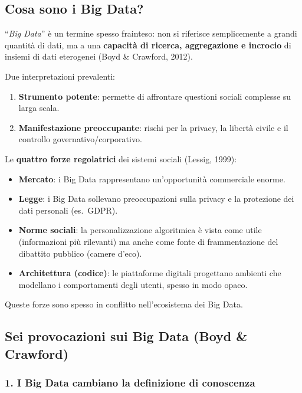 \documentclass[12pt,a4paper]{article}
\begin{document}
\subsection{Cosa sono i Big Data?}

``\textit{Big Data}'' è un termine spesso frainteso: non si riferisce semplicemente a
grandi quantità di dati, ma a una \textbf{capacità di ricerca, aggregazione e
incrocio} di insiemi di dati eterogenei (Boyd \& Crawford, 2012).

\medskip
\noindent Due interpretazioni prevalenti:
\begin{enumerate}
  \item \textbf{Strumento potente}: permette di affrontare questioni sociali complesse
        su larga scala.
  \item \textbf{Manifestazione preoccupante}: rischi per la privacy, la libertà civile
        e il controllo governativo/corporativo.
\end{enumerate}

\noindent Le \textbf{quattro forze regolatrici} dei sistemi sociali (Lessig, 1999):
\begin{itemize}
  \item \textbf{Mercato}: i Big Data rappresentano un'opportunità commerciale enorme.
  \item \textbf{Legge}: i Big Data sollevano preoccupazioni sulla privacy e la protezione
        dei dati personali (es.\ GDPR).
  \item \textbf{Norme sociali}: la personalizzazione algoritmica è vista come utile
        (informazioni più rilevanti) ma anche come fonte di frammentazione del dibattito
        pubblico (camere d'eco).
  \item \textbf{Architettura (codice)}: le piattaforme digitali progettano ambienti che
        modellano i comportamenti degli utenti, spesso in modo opaco.
\end{itemize}
Queste forze sono spesso in conflitto nell'ecosistema dei Big Data.

\subsection{Sei provocazioni sui Big Data (Boyd \& Crawford)}

\subsubsection{1. I Big Data cambiano la definizione di conoscenza}
\end{document}
